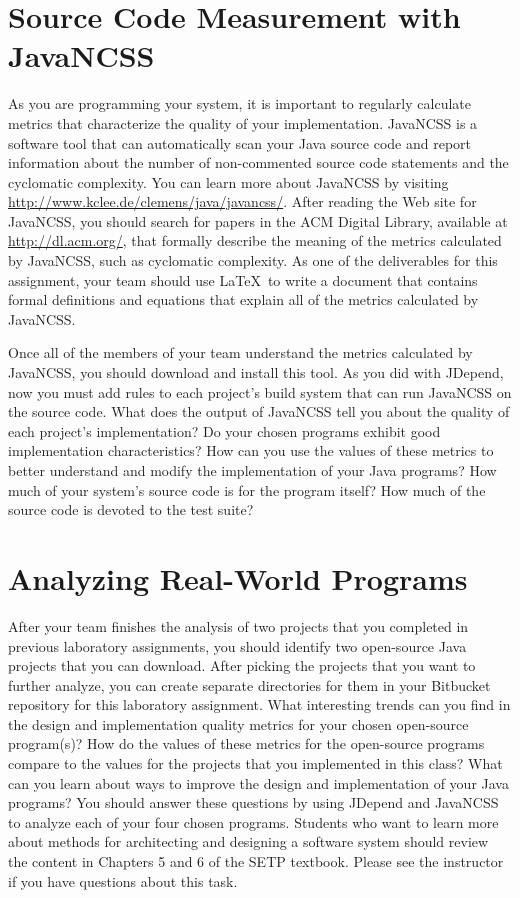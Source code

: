 \section*{Source Code Measurement with JavaNCSS}

As you are programming your system, it is important to regularly calculate metrics that characterize the quality of
your implementation.  JavaNCSS is a software tool that can automatically scan your Java source code and report
information about the number of non-commented source code statements and the cyclomatic complexity.  You can learn more
about JavaNCSS by visiting \url{http://www.kclee.de/clemens/java/javancss/}. After reading the Web site for JavaNCSS,
you should search for papers in the ACM Digital Library, available at \url{http://dl.acm.org/}, that formally describe
the meaning of the metrics calculated by JavaNCSS, such as cyclomatic complexity. As one of the deliverables for this
assignment, your team should use \LaTeX\ to write a document that contains formal definitions and equations that explain
all of the metrics calculated by JavaNCSS.

Once all of the members of your team understand the metrics calculated by JavaNCSS, you should download and install
this tool.  As you did with JDepend, now you must add rules to each project's build system that can run JavaNCSS on the
source code. What does the output of JavaNCSS tell you about the quality of each project's implementation? Do your
chosen programs exhibit good implementation characteristics? How can you use the values of these metrics to better
understand and modify the implementation of your Java programs? How much of your system's source code is for the
program itself? How much of the source code is devoted to the test suite?

\section*{Analyzing Real-World Programs}

After your team finishes the analysis of two projects that you completed in previous laboratory assignments, you should
identify two open-source Java projects that you can download.  After picking the projects that you want to further
analyze, you can create separate directories for them in your Bitbucket repository for this laboratory assignment.  What
interesting trends can you find in the design and implementation quality metrics for your chosen open-source program(s)?
How do the values of these metrics for the open-source programs compare to the values for the projects that you
implemented in this class?  What can you learn about ways to improve the design and implementation of your Java
programs? You should answer these questions by using JDepend and JavaNCSS to analyze each of your four chosen programs.
Students who want to learn more about methods for architecting and designing a software system should review the content
in Chapters 5 and 6 of the SETP textbook. Please see the instructor if you have questions about this task.

